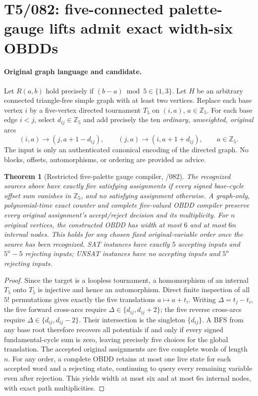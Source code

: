 \documentclass[11pt]{article}
\newtheorem{theorem}{Theorem}
\begin{document}
\section{T5/082: five-connected palette-gauge lifts admit exact width-six OBDDs}
\label{sec:t5palette082}

\paragraph{Original graph language and candidate.}
Let $R(a,b)$ hold precisely if $(b-a)\bmod 5\in\{1,3\}$.
Let $H$ be an arbitrary connected triangle-free simple graph with at
least two vertices.  Replace each base vertex $i$ by a five-vertex
directed tournament $T_5$ on $(i,a)$, $a\in\mathbb Z_5$.
For each base edge $i<j$, select $d_{ij}\in\mathbb Z_5$ and add precisely
the ten \emph{ordinary, unweighted, original} arcs
\[
 (i,a)\longrightarrow(j,a+1-d_{ij}),\qquad
 (j,a)\longrightarrow(i,a+1+d_{ij}),
 \qquad a\in\mathbb Z_5.
\]
The input is only an authenticated canonical encoding of the directed
graph.  No blocks, offsets, automorphisms, or ordering are provided as advice.

\begin{theorem}[Restricted five-palette gauge compiler, /082]
The recognized sources above have exactly five satisfying assignments
if every signed base-cycle offset sum vanishes in $\mathbb Z_5$,
and no satisfying assignment otherwise. A graph-only,
polynomial-time exact counter and complete five-valued OBDD compiler
preserve every original assignment's accept/reject decision and its
multiplicity. For $n$ original vertices, the constructed OBDD has
width at most $6$ and at most $6n$ internal nodes.  This holds for
any chosen fixed original-variable order once the source has been
recognized.  SAT instances have exactly $5$ accepting inputs and
$5^n-5$ rejecting inputs; UNSAT instances have no accepting inputs
and $5^n$ rejecting inputs.
\end{theorem}

\begin{proof}
Since the target is a loopless tournament, a homomorphism of an
internal $T_5$ onto $T_5$ is injective and hence an automorphism.
Direct finite inspection of all $5!$ permutations gives exactly
the five translations $a\mapsto a+t_i$.
Writing $\Delta=t_j-t_i$, the five forward cross-arcs require
$\Delta\in\{d_{ij},d_{ij}+2\}$; the five reverse cross-arcs require
$\Delta\in\{d_{ij},d_{ij}-2\}$. Their intersection is the singleton
$\{d_{ij}\}$. A BFS from any base root therefore recovers all
potentials if and only if every signed fundamental-cycle sum is zero,
leaving precisely five choices for the global translation.
The accepted original assignments are five complete words of length $n$.
For any order, a complete OBDD retains at most one live state for
each accepted word and a rejecting state, continuing to query every
remaining variable even after rejection. This yields width at most
six and at most $6n$ internal nodes, with exact path multiplicities.
\end{proof}
\end{document}
